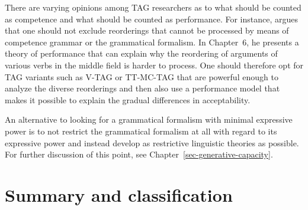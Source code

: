 There are varying opinions among TAG researchers as to what should be counted as competence and what
should be counted as performance. For instance, \citet[]{Rambow94a} argues that one should
not exclude reorderings that cannot be processed by means of competence grammar or the grammatical
formalism. In Chapter~6, he presents a theory of performance that can explain why the reordering of
arguments of various verbs in the middle field is harder to process.
One should therefore opt for TAG variants such as V-TAG or TT-MC-TAG \citep{Lichte2007a} that are powerful enough to analyze the diverse reorderings
	and then also use a performance model that makes it possible to explain the gradual differences in acceptability.

An alternative to looking for a grammatical formalism with minimal expressive power is to not restrict the grammatical formalism at all with regard
to its expressive power and instead develop as restrictive linguistic theories as possible. For further discussion of this point, see 
Chapter~\ref{sec-generative-capacity}.

\section{Summary and classification}

